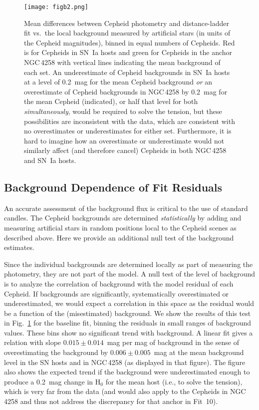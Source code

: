 \documentclass[12pt]{aastex631}
\begin{document}
\begin{appendices}
\begin{figure}[t]  
\begin{center}
\texttt{[image: figb2.png]}
\end{center}
\caption{\label{fg:vscrowd} Mean differences between Cepheid photometry and distance-ladder fit vs.~the local background measured by artificial stars (in units of the Cepheid magnitudes), binned in equal numbers of Cepheids. Red is for Cepheids in SN~Ia hosts and green for Cepheids in the anchor NGC$\,$4258 with vertical lines indicating the mean background of each set.  An underestimate of Cepheid backgrounds in SN~Ia hosts at a level of 0.2~mag for the mean Cepheid background {\it or} an overestimate of Cepheid backgrounds in NGC$\,$4258 by 0.2~mag for the mean Cepheid (indicated), or half that level for both {\it simultaneously}, would be required to solve the tension, but these possibilities are inconsistent with the data, which are consistent with no overestimates or underestimates for either set.  Furthermore, it is hard to imagine how an overestimate or underestimate would not similarly affect (and therefore cancel) Cepheids in both NGC$\,$4258 and SN~Ia hosts.}
\end{figure}

\subsection{Background Dependence of Fit Residuals}

An accurate assessment of the background flux is critical to the use of standard candles.  The Cepheid backgrounds are determined {\it statistically} by adding and measuring artificial stars in random positions local to the Cepheid scenes as described above. Here we provide an additional null test of the background estimates.

Since the individual backgrounds are determined locally as part of measuring the photometry, they are not part of the model.  A null test of the level of background is to analyze the correlation of background with the model residual of each Cepheid. If backgrounds are significantly, systematically overestimated or underestimated, we would expect a correlation in this space as the residual would be a function of the (misestimated) background.  We show the results of this test in Fig.~\ref{fg:vscrowd} for the baseline fit, binning the residuals in small ranges of background values.  These bins show no significant trend with background.  A linear fit gives a relation with slope $0.015\pm 0.014$~mag per mag of background in the sense of overestimating the background by $0.006\pm0.005$~mag at the mean background level in the SN hosts and in NGC$\,$4258 (as displayed in that figure). The figure also shows the expected trend if the background were underestimated enough to produce a 0.2~mag change in H$_0$ for the mean host (i.e., to solve the tension), which is very far from the data (and would also apply to the Cepheids in NGC$\,$4258 and thus not address the discrepancy for that anchor in Fit~10).


\end{appendices}
\end{document}
